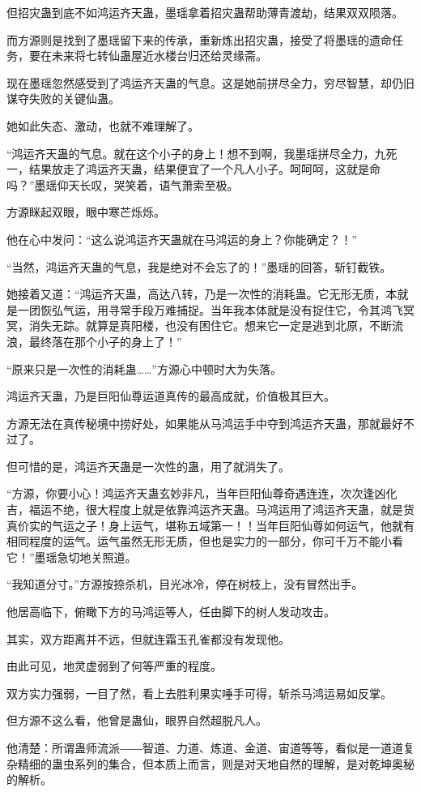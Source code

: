 \begin{this_body}
但招灾蛊到底不如鸿运齐天蛊，墨瑶拿着招灾蛊帮助薄青渡劫，结果双双陨落。

而方源则是找到了墨瑶留下来的传承，重新炼出招灾蛊，接受了将墨瑶的遗命任务，要在未来将七转仙蛊屋近水楼台归还给灵缘斋。

现在墨瑶忽然感受到了鸿运齐天蛊的气息。这是她前拼尽全力，穷尽智慧，却仍旧谋夺失败的关键仙蛊。

她如此失态、激动，也就不难理解了。

“鸿运齐天蛊的气息。就在这个小子的身上！想不到啊，我墨瑶拼尽全力，九死一，结果放走了鸿运齐天蛊，结果便宜了一个凡人小子。呵呵呵，这就是命吗？”墨瑶仰天长叹，哭笑着，语气萧索至极。

方源眯起双眼，眼中寒芒烁烁。

他在心中发问：“这么说鸿运齐天蛊就在马鸿运的身上？你能确定？！”

“当然，鸿运齐天蛊的气息，我是绝对不会忘了的！”墨瑶的回答，斩钉截铁。

她接着又道：“鸿运齐天蛊，高达八转，乃是一次性的消耗蛊。它无形无质，本就是一团恢弘气运，用寻常手段万难捕捉。当年我本体就是没有捉住它，令其鸿飞冥冥，消失无踪。就算是真阳楼，也没有困住它。想来它一定是逃到北原，不断流浪，最终落在那个小子的身上了！”

“原来只是一次性的消耗蛊……”方源心中顿时大为失落。

鸿运齐天蛊，乃是巨阳仙尊运道真传的最高成就，价值极其巨大。

方源无法在真传秘境中捞好处，如果能从马鸿运手中夺到鸿运齐天蛊，那就最好不过了。

但可惜的是，鸿运齐天蛊是一次性的蛊，用了就消失了。

“方源，你要小心！鸿运齐天蛊玄妙非凡，当年巨阳仙尊奇遇连连，次次逢凶化吉，福运不绝，很大程度上就是依靠鸿运齐天蛊。马鸿运用了鸿运齐天蛊，就是货真价实的气运之子！身上运气，堪称五域第一！！当年巨阳仙尊如何运气，他就有相同程度的运气。运气虽然无形无质，但也是实力的一部分，你可千万不能小看它！”墨瑶急切地关照道。

“我知道分寸。”方源按捺杀机，目光冰冷，停在树枝上，没有冒然出手。

他居高临下，俯瞰下方的马鸿运等人，任由脚下的树人发动攻击。

其实，双方距离并不远，但就连霜玉孔雀都没有发现他。

由此可见，地灵虚弱到了何等严重的程度。

双方实力强弱，一目了然，看上去胜利果实唾手可得，斩杀马鸿运易如反掌。

但方源不这么看，他曾是蛊仙，眼界自然超脱凡人。

他清楚：所谓蛊师流派――智道、力道、炼道、金道、宙道等等，看似是一道道复杂精细的蛊虫系列的集合，但本质上而言，则是对天地自然的理解，是对乾坤奥秘的解析。


\end{this_body}
